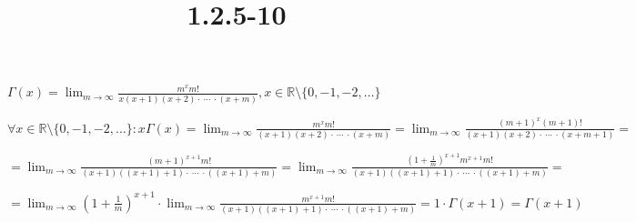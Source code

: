 \documentclass{article}
\title{1.2.5-10}
\begin{document}
\maketitle

\( \Gamma(x) = \lim_{m\to\infty} \frac{m^xm!}{x(x+1)(x+2) \cdot\ \cdots\ \cdot (x+m)}, x \in \mathbb{R} \setminus \{ 0, -1, -2, \ldots \} \)

\( \forall x \in \mathbb{R} \setminus \{ 0, -1, -2, \ldots \}: x\Gamma(x) = \lim_{m\to\infty} \frac{m^xm!}{(x+1)(x+2) \cdot\ \cdots\ \cdot (x+m)} =   \lim_{m\to\infty} \frac{(m+1)^x(m+1)!}{(x+1)(x+2) \cdot\ \cdots\ \cdot (x+m+1)} = \)

\( = \lim_{m\to\infty}\frac{(m+1)^{x+1}m!}{(x+1)((x+1)+1) \cdot\ \cdots\ \cdot ((x+1)+m)} = \lim_{m\to\infty}\frac{(1+\frac{1}{m})^{x+1}m^{x+1}m!}{(x+1)((x+1)+1) \cdot\ \cdots\ \cdot ((x+1)+m)} = \)

\( = \lim_{m\to\infty}{(1+\frac{1}{m})^{x+1}} \cdot \lim_{m\to\infty}\frac{m^{x+1}m!}{(x+1)((x+1)+1) \cdot\ \cdots\ \cdot ((x+1)+m)} = 1 \cdot \Gamma(x+1) = \Gamma(x+1) \)
\end{document}
